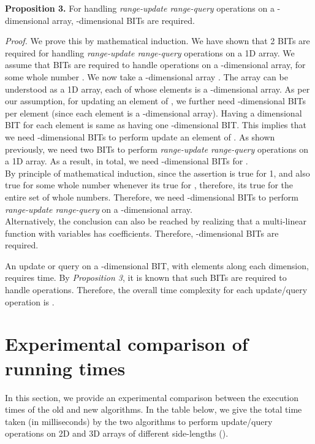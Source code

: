 \documentclass[a4paper]{article}
\begin{document}
\vspace{2 mm}
\noindent
\textbf{Proposition 3.} For handling \textit{range-update range-query} operations on a -dimensional array,  -dimen\-sional BITs are required.

\vspace{1 mm}
\noindent
\textit{Proof.} We prove this by mathematical induction. We have shown that 2 BITs are required for handling \textit{range-update range-query} operations on a 1D array. We assume that  BITs are required to handle operations on a -dimensional array, for some whole number .
We now take a -dimensional array . The array  can be understood as a 1D array, each of whose elements is a -dimensional array. As per our assumption, for updating an element of , we further need  -dimensional BITs per element (since each element is a -dimensional array). Having a  dimensional BIT for each element is same as having one -dimensional BIT. This implies that we need  -dimensional BITs to perform update an element of . As shown previously, we need two BITs to perform \textit{range-update range-query} operations on a 1D array. As a result, in total, we need  -dimensional BITs for .\\
By principle of mathematical induction, since the assertion is true for 1, and also true for some whole number  whenever its true for , therefore, its true for the entire set of whole numbers. Therefore, we need  -dimensional BITs to perform \textit{range-update range-query} on a -dimensional array.\\
Alternatively, the conclusion can also be reached by realizing that a multi-linear function with  variables has  coefficients. Therefore,  -dimensional BITs are required.

\vspace{2 mm}
An update or query on a -dimensional BIT, with  elements along each dimension, requires  time. By \textit{Proposition 3}, it is known that  such BITs are required to handle operations. Therefore, the overall time complexity for each update/query operation is  .



\section{Experimental comparison of running times}
In this section, we provide an experimental comparison between the execution times of the old and new algorithms. In the table below, we give the total time taken (in milliseconds) by the two algorithms to perform  update/query operations on 2D and 3D arrays of different side-lengths ().
\end{document}

